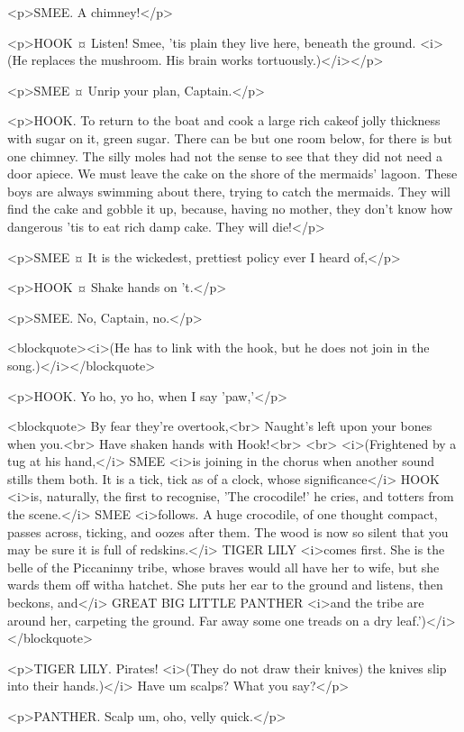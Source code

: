 <p>SMEE. A chimney!</p>

<p>HOOK ¤
Listen! Smee, 'tis plain they live here, beneath the ground. <i>(He replaces the mushroom. His brain works tortuously.)</i></p>

<p>SMEE ¤
Unrip your plan, Captain.</p>

<p>HOOK. To return to the boat and cook a large rich cakeof jolly thickness with sugar on it, green sugar. There can be but one room below, for there is but one chimney. The silly moles had not the sense to see that they did not need a door apiece. We must leave the cake on the shore of the mermaids' lagoon. These boys are always swimming about there, trying to catch the mermaids. They will find the cake and gobble it up, because, having no mother, they don't know how dangerous 'tis to eat rich damp cake. They will die!</p>

<p>SMEE ¤
It is the wickedest, prettiest policy ever I heard of,</p>

<p>HOOK ¤
Shake hands on 't.</p>

<p>SMEE. No, Captain, no.</p>

<blockquote><i>(He has to link with the hook, but he does not join in the song.)</i></blockquote>

<p>HOOK. Yo ho, yo ho, when I say 'paw,'</p>

<blockquote> By fear they're overtook,<br> Naught's left upon your bones when you.<br> Have shaken hands with Hook!<br> <br> <i>(Frightened by a tug at his hand,</i> SMEE <i>is joining in the chorus when another sound stills them both. It is a tick, tick as of a clock, whose significance</i> HOOK <i>is, naturally, the first to recognise, 'The crocodile!' he cries, and totters from the scene.</i> SMEE <i>follows. A huge crocodile, of one thought compact, passes across, ticking, and oozes after them. The wood is now so silent that you may be sure it is full of redskins.</i> TIGER LILY <i>comes first. She is the belle of the Piccaninny tribe, whose braves would all have her to wife, but she wards them off witha hatchet. She puts her ear to the ground and listens, then beckons, and</i> GREAT BIG LITTLE PANTHER <i>and the tribe are around her, carpeting the ground. Far away some one treads on a dry leaf.')</i></blockquote>

<p>TIGER LILY. Pirates! <i>(They do not draw their knives) the knives slip into their hands.)</i> Have um scalps? What you say?</p>

<p>PANTHER. Scalp um, oho, velly quick.</p>

